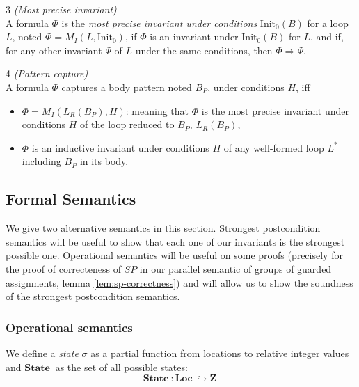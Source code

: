 \documentclass[a4paper,10pt]{article}
\newcommand{\Init}{\ensuremath{\mathrm{Init_{0}}}}
\newcommand{\SLoc}{\ensuremath{\mathrm{\textbf{Loc}}~}}
\newcommand{\Sstate}{\ensuremath{\mathrm{\textbf{State}}~}}
\newcommand{\SZ}{\ensuremath{\mathrm{\textbf{Z}}~}}
\newenvironment{definition}[1][Definition]{\begin{trivlist}
\item[\hskip \labelsep {\bfseries #1}]}{\end{trivlist}}
\begin{document}
\begin{definition} 3 \emph {(Most precise invariant)}\\
A formula $\Phi$ is the \textit{most precise invariant under  conditions}
$\Init(B)$ for a loop $L$, noted $\Phi = M_I(L, \Init)$, if $\Phi$ is an invariant 
under $\Init(B)$ for $L$, and if, for any other invariant $\Psi$ of $L$ under the 
same conditions, then $\Phi \Rightarrow \Psi$.
\end{definition}

\begin{definition} 4 \emph {(Pattern capture)}\\
A formula $\Phi$ captures a body pattern noted $B_P$, under conditions $H$,  iff
\begin{itemize}
\item[i.]  $\Phi = M_I(L_R(B_P),H)$: meaning that $\Phi$ is the most precise invariant 
           under conditions $H$ of the loop reduced to $B_P$, $L_R(B_P)$, 
\item[ii.] $\Phi$ is an inductive invariant under conditions $H$ of any well-formed loop $L^*$ 
           including $B_P$ in its body.
\end{itemize}
\end{definition}

\subsection*{Formal Semantics}

We give two alternative semantics in this section. Strongest postcondition semantics 
will be useful to show that each one of our invariants is the strongest possible one. 
Operational semantics will be useful on some proofs (precisely for the proof of correcteness
of $SP$ in our parallel semantic of groups of guarded assignments, lemma \ref{lem:sp-correctness}) 
and will allow us to show  the soundness of the strongest postcondition semantics.

\subsubsection*{Operational semantics}
\newcommand{\env}{\ensuremath{\sigma}\xspace}
\newcommand{\eval}[2]{<#1, #2>}

We define a \textit{state} $\sigma$ as a partial function from locations to relative 
integer values and $\Sstate$ as the set of all possible states:
$$\Sstate : \SLoc \hookrightarrow \SZ$$
\end{document}
